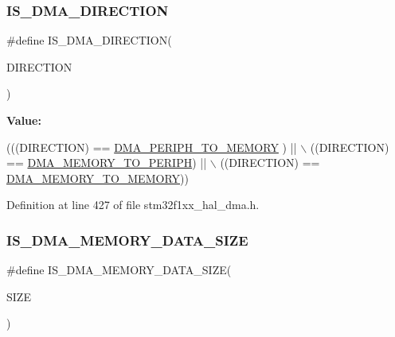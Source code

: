\subsubsection{\texorpdfstring{I\+S\+\_\+\+D\+M\+A\+\_\+\+D\+I\+R\+E\+C\+T\+I\+ON}{IS\_DMA\_DIRECTION}}
{\footnotesize\ttfamily \#define I\+S\+\_\+\+D\+M\+A\+\_\+\+D\+I\+R\+E\+C\+T\+I\+ON(\begin{DoxyParamCaption}\item[{}]{D\+I\+R\+E\+C\+T\+I\+ON }\end{DoxyParamCaption})}

{\bfseries Value\+:}
\begin{DoxyCode}
(((DIRECTION) == \hyperlink{group___d_m_a___data__transfer__direction_gacb2cbf03ecae6804ae4a6f60a3e37c12}{DMA\_PERIPH\_TO\_MEMORY} ) || \(\backslash\)
                                     ((DIRECTION) == \hyperlink{group___d_m_a___data__transfer__direction_ga9e76fc559a2d5c766c969e6e921b1ee9}{DMA\_MEMORY\_TO\_PERIPH})  || \(\backslash\)
                                     ((DIRECTION) == \hyperlink{group___d_m_a___data__transfer__direction_ga0695035d725855ccf64d2d8452a33810}{DMA\_MEMORY\_TO\_MEMORY}))
\end{DoxyCode}


Definition at line 427 of file stm32f1xx\+\_\+hal\+\_\+dma.\+h.

\mbox{\label{group___d_m_a___private___macros_gac9e3748cebcb16d4ae4206d562bc804c}} 
\subsubsection{\texorpdfstring{I\+S\+\_\+\+D\+M\+A\+\_\+\+M\+E\+M\+O\+R\+Y\+\_\+\+D\+A\+T\+A\+\_\+\+S\+I\+ZE}{IS\_DMA\_MEMORY\_DATA\_SIZE}}
{\footnotesize\ttfamily \#define I\+S\+\_\+\+D\+M\+A\+\_\+\+M\+E\+M\+O\+R\+Y\+\_\+\+D\+A\+T\+A\+\_\+\+S\+I\+ZE(\begin{DoxyParamCaption}\item[{}]{S\+I\+ZE }\end{DoxyParamCaption})}

